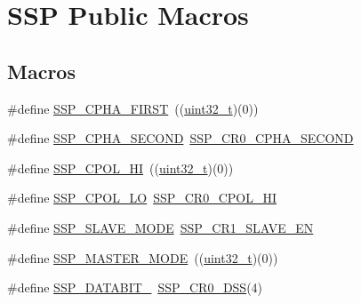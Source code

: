 \hypertarget{group___s_s_p___public___macros}{}\section{S\+SP Public Macros}
\label{group___s_s_p___public___macros}
\subsection*{Macros}
\begin{DoxyCompactItemize}
\item 
\#define \hyperlink{group___s_s_p___public___macros_ga6333b5eaf9d5301431fc0399c0d417d5}{S\+S\+P\+\_\+\+C\+P\+H\+A\+\_\+\+F\+I\+R\+ST}~((\hyperlink{_p_e___types_8h_a33594304e786b158f3fb30289278f5af}{uint32\+\_\+t})(0))
\item 
\#define \hyperlink{group___s_s_p___public___macros_ga04ad38295445819979f55503eed5c177}{S\+S\+P\+\_\+\+C\+P\+H\+A\+\_\+\+S\+E\+C\+O\+ND}~\hyperlink{group___s_s_p___private___macros_gae4150d0b2513ff70568be15c2170c9ea}{S\+S\+P\+\_\+\+C\+R0\+\_\+\+C\+P\+H\+A\+\_\+\+S\+E\+C\+O\+ND}
\item 
\#define \hyperlink{group___s_s_p___public___macros_gaf64aec37a92ca6c14c23af6fc0052ccb}{S\+S\+P\+\_\+\+C\+P\+O\+L\+\_\+\+HI}~((\hyperlink{_p_e___types_8h_a33594304e786b158f3fb30289278f5af}{uint32\+\_\+t})(0))
\item 
\#define \hyperlink{group___s_s_p___public___macros_ga1e10eccdb2b293607764028aab1b98a9}{S\+S\+P\+\_\+\+C\+P\+O\+L\+\_\+\+LO}~\hyperlink{group___s_s_p___private___macros_ga36d7ad75edb14d318d710f964384f466}{S\+S\+P\+\_\+\+C\+R0\+\_\+\+C\+P\+O\+L\+\_\+\+HI}
\item 
\#define \hyperlink{group___s_s_p___public___macros_gac6bc4b92810caa934b2d7116390098c6}{S\+S\+P\+\_\+\+S\+L\+A\+V\+E\+\_\+\+M\+O\+DE}~\hyperlink{group___s_s_p___private___macros_ga483d570ffc25bc917c99b3e8ece75649}{S\+S\+P\+\_\+\+C\+R1\+\_\+\+S\+L\+A\+V\+E\+\_\+\+EN}
\item 
\#define \hyperlink{group___s_s_p___public___macros_ga3c9cbd4f4b8169253d26f4d40cdc414d}{S\+S\+P\+\_\+\+M\+A\+S\+T\+E\+R\+\_\+\+M\+O\+DE}~((\hyperlink{_p_e___types_8h_a33594304e786b158f3fb30289278f5af}{uint32\+\_\+t})(0))
\item 
\#define \hyperlink{group___s_s_p___public___macros_ga238b6583278a25eba784cc4084ecd87f}{S\+S\+P\+\_\+\+D\+A\+T\+A\+B\+I\+T\+\_}~\hyperlink{group___s_s_p___private___macros_gac08fdfb1d7152206ec8a46ae361ceee3}{S\+S\+P\+\_\+\+C\+R0\+\_\+\+D\+SS}(4)

\end{DoxyCompactItemize}
